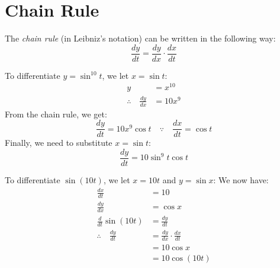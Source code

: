 \documentclass[../main.tex]{subfiles}
\begin{document}
\section{Chain Rule}
The \emph{chain rule} (in Leibniz's notation) can be written 
in the following way:
\[ \frac{dy}{dt} = \frac{dy}{dx} \cdot \frac{dx}{dt} \]
\begin{exmp}
    To differentiate $y = \sin^{10} t$, we let 
    $x = \sin t$:
    \begin{align*}
        y &= x^{10}\\
        \therefore \quad \frac{dy}{dx} &= 10x^9
    \end{align*}
    From the chain rule, we get:
    \[ \frac{dy}{dt} = 10x^9 \cos t \quad \because \quad \frac{dx}{dt} = \cos t \]
    Finally, we need to substitute $x = \sin t$:
    \[ \frac{dy}{dt} = 10 \sin^9 t \cos t \]
\end{exmp}
\begin{exmp}
    To differentiate $\sin (10t)$, we let 
    $x = 10t$ and $y = \sin x$:
    We now have:
    \begin{align*}
        \frac{dx}{dt} &= 10\\
        \frac{dy}{dx} &= \cos x\\
        \frac{d}{dt} \sin (10t) &= \frac{dy}{dt}\\
        \therefore \quad \frac{dy}{dt}  &= \frac{dy}{dx} \cdot \frac{dx}{dt}\\
                                        &= 10 \cos x\\
                                        &= 10 \cos (10t)
    \end{align*}
\end{exmp}
\end{document}
